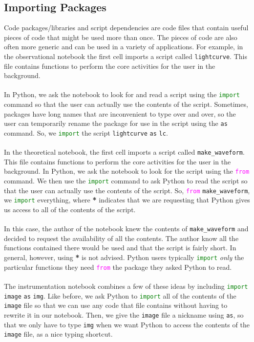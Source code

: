 \documentclass[14pt]{article}
\begin{document}
\subsection{Importing Packages}
\label{a:packages}
Code packages/libraries and script dependencies are code files that contain useful pieces of code that might be used more than once. The pieces of code are also often more generic and can be used in a variety of applications. For example, in the observational notebook the first cell imports a script called \texttt{lightcurve}. This file contains functions to perform the core activities for the user in the background.
\\\\
In Python, we ask the notebook to look for  and read a script using the \texttt{\textcolor{green}{import}} command so that the user can actually use the contents of the script. Sometimes, packages have long names that are inconvenient to type over and over, so the user can temporarily rename the package for use in the script using the \texttt{\textcolor{Cerulean}{as}} command. So, we \texttt{\textcolor{green}{import}} the script \texttt{lightcurve} \texttt{\textcolor{Cerulean}{as}} \texttt{lc}.
\\\\
In the theoretical notebook, the first cell imports a script called \texttt{make\_waveform}. This file contains functions to perform the core activities for the user in the background. In Python, we ask the notebook to look for the script using the \texttt{\textcolor{magenta}{from}} command. We then use the \texttt{\textcolor{green}{import}} command to ask Python to read the script so that the user can actually use the contents of the script. So, \texttt{\textcolor{magenta}{from}} \texttt{make\_waveform}, we \texttt{\textcolor{green}{import}} everything, where \textbf{*} indicates that we are requesting that Python gives us access to all of the contents of the script.
\\\\
In this case, the author of the notebook knew the contents of \texttt{make\_waveform} and decided to request the availability of all the contents. The author know all the functions contained there would be used and that the script is fairly short. In general, however, using \textbf{*} is not advised. Python users typically \texttt{\textcolor{green}{import}} \textit{only} the particular functions they need \texttt{\textcolor{magenta}{from}} the package they asked Python to read.
\\\\
The instrumentation notebook combines a few of these ideas by including \texttt{\textcolor{green}{import}} \texttt{image} \texttt{\textcolor{Cerulean}{as}} \texttt{img}. Like before, we ask Python to \texttt{\textcolor{green}{import}} all of the contents of the \texttt{image} file so that we can use any code that file contains without having to rewrite it in our notebook. Then, we give the \texttt{image} file a nickname using \texttt{\textcolor{Cerulean}{as}}, so that we only have to type \texttt{img} when we want Python to access the contents of the \texttt{image} file, as a nice typing shortcut.
\end{document}
